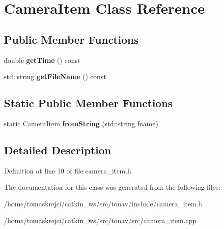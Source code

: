 \hypertarget{class_camera_item}{\section{Camera\-Item Class Reference}
\label{class_camera_item}
}
\subsection*{Public Member Functions}
\begin{DoxyCompactItemize}
\item 
\hypertarget{class_camera_item_a6227ac10298e97b4ae86371de99cd4c9}{double {\bfseries get\-Time} () const }\label{class_camera_item_a6227ac10298e97b4ae86371de99cd4c9}

\item 
\hypertarget{class_camera_item_a6e19e5bdbfc691fb8abc4e94ef43f05e}{std\-::string {\bfseries get\-File\-Name} () const }\label{class_camera_item_a6e19e5bdbfc691fb8abc4e94ef43f05e}

\end{DoxyCompactItemize}
\subsection*{Static Public Member Functions}
\begin{DoxyCompactItemize}
\item 
\hypertarget{class_camera_item_a4cccf1e169a05288c47ecf232afb2086}{static \hyperlink{class_camera_item}{Camera\-Item} {\bfseries from\-String} (std\-::string fname)}\label{class_camera_item_a4cccf1e169a05288c47ecf232afb2086}

\end{DoxyCompactItemize}


\subsection{Detailed Description}


Definition at line 10 of file camera\-\_\-item.\-h.



The documentation for this class was generated from the following files\-:\begin{DoxyCompactItemize}
\item 
/home/tomaskrejci/catkin\-\_\-ws/src/tonav/include/camera\-\_\-item.\-h\item 
/home/tomaskrejci/catkin\-\_\-ws/src/tonav/src/camera\-\_\-item.\-cpp\end{DoxyCompactItemize}

